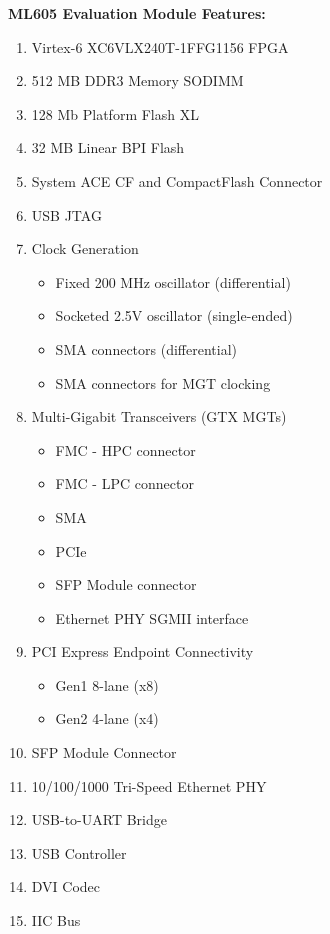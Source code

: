 \textbf{ML605 Evaluation Module Features:}
\begin{enumerate}
  \item Virtex-6 XC6VLX240T-1FFG1156 FPGA
  \item 512 MB DDR3 Memory SODIMM
  \item 128 Mb Platform Flash XL
  \item 32 MB Linear BPI Flash
  \item System ACE CF and CompactFlash Connector
  \item USB JTAG
  \item Clock Generation
  \begin{itemize}
    \item Fixed 200 MHz oscillator (differential)
    \item Socketed 2.5V oscillator (single-ended)
    \item SMA connectors (differential)
    \item SMA connectors for MGT clocking
  \end{itemize}

  \item Multi-Gigabit Transceivers (GTX MGTs)

  \begin{itemize}
    \item FMC - HPC connector
    \item FMC - LPC connector
    \item SMA
    \item PCIe
    \item SFP Module connector
    \item Ethernet PHY SGMII interface
  \end{itemize}

  \item PCI Express Endpoint Connectivity

  \begin{itemize}
    \item Gen1 8-lane (x8)
    \item Gen2 4-lane (x4)
  \end{itemize}

  \item SFP Module Connector
  \item 10/100/1000 Tri-Speed Ethernet PHY
  \item USB-to-UART Bridge
  \item USB Controller
  \item DVI Codec
  \item IIC Bus


\end{enumerate}
